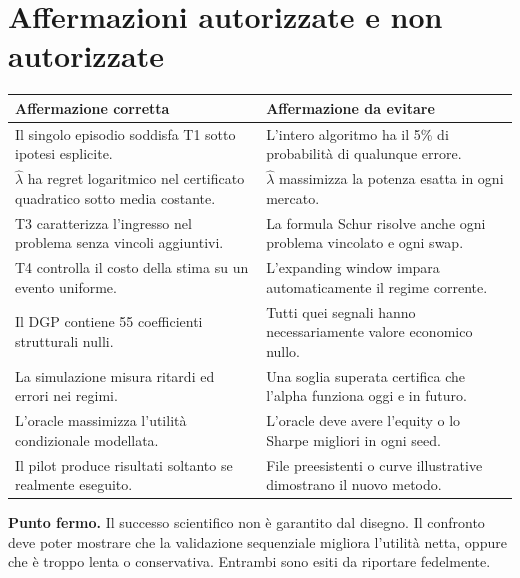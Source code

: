 \documentclass[11pt,a4paper]{article}
\theoremstyle{definition}\newtheorem{definition}[theorem]{Definizione}
\theoremstyle{remark}\newtheorem{remark}[theorem]{Osservazione}
\newcommand{\important}[1]{\par\smallskip\noindent\colorbox{light}{\parbox{0.963\linewidth}{\textbf{Punto fermo.} #1}}\par\smallskip}
\begin{document}
\section{Affermazioni autorizzate e non autorizzate}
\begin{longtable}{p{.44\linewidth}p{.50\linewidth}}
\toprule Affermazione corretta & Affermazione da evitare\\\midrule\endhead
Il singolo episodio soddisfa T1 sotto ipotesi esplicite. & L'intero algoritmo ha il 5\% di probabilità di qualunque errore.\\
$\widehat\lambda$ ha regret logaritmico nel certificato quadratico sotto media costante. & $\widehat\lambda$ massimizza la potenza esatta in ogni mercato.\\
T3 caratterizza l'ingresso nel problema senza vincoli aggiuntivi. & La formula Schur risolve anche ogni problema vincolato e ogni swap.\\
T4 controlla il costo della stima su un evento uniforme. & L'expanding window impara automaticamente il regime corrente.\\
Il DGP contiene 55 coefficienti strutturali nulli. & Tutti quei segnali hanno necessariamente valore economico nullo.\\
La simulazione misura ritardi ed errori nei regimi. & Una soglia superata certifica che l'alpha funziona oggi e in futuro.\\
L'oracle massimizza l'utilità condizionale modellata. & L'oracle deve avere l'equity o lo Sharpe migliori in ogni seed.\\
Il pilot produce risultati soltanto se realmente eseguito. & File preesistenti o curve illustrative dimostrano il nuovo metodo.\\\bottomrule
\end{longtable}

\important{Il successo scientifico non è garantito dal disegno. Il confronto deve poter mostrare che la validazione sequenziale migliora l'utilità netta, oppure che è troppo lenta o conservativa. Entrambi sono esiti da riportare fedelmente.}
\end{document}
